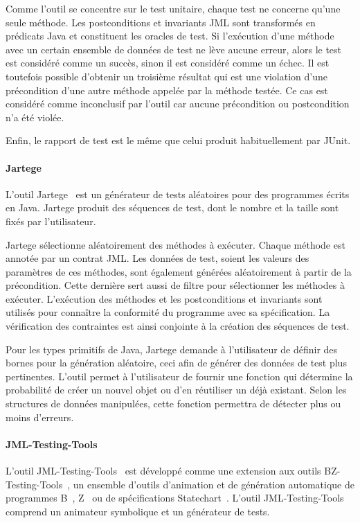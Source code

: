 Comme l'outil se concentre sur le test unitaire, chaque test ne concerne qu'une
seule méthode. Les postconditions et invariants JML sont transformés en
prédicats Java et constituent les oracles de test. Si l'exécution d'une méthode
avec un certain ensemble de données de test ne lève aucune erreur, alors le
test est considéré comme un succès, sinon il est considéré comme un échec. Il
est toutefois possible d'obtenir un troisième résultat qui est une violation
d'une précondition d'une autre méthode appelée par la méthode testée.  Ce cas
est considéré comme inconclusif par l'outil car aucune précondition ou
postcondition n'a été violée.

Enfin, le rapport de test est le même que celui produit habituellement par
JUnit.

\paragraph{Jartege} L'outil Jartege~ est un générateur de tests
aléatoires pour des programmes écrits en Java. Jartege produit des séquences de
test, dont le nombre et la taille sont fixés par l'utilisateur.

Jartege sélectionne aléatoirement des méthodes à exécuter. Chaque méthode est
annotée par un contrat JML. Les données de test, soient les valeurs des
paramètres de ces méthodes, sont également générées aléatoirement à partir de la
précondition. Cette dernière sert aussi de filtre pour sélectionner les méthodes
à exécuter. L'exécution des méthodes et les postconditions et invariants sont
utilisés pour connaître la conformité du programme avec sa spécification. La
vérification des contraintes est ainsi conjointe à la création des séquences de
test.

Pour les types primitifs de Java, Jartege demande à l'utilisateur de définir des
bornes pour la génération aléatoire, ceci afin de générer des données de test
plus pertinentes. L'outil permet à l'utilisateur de fournir une fonction qui
détermine la probabilité de créer un nouvel objet ou d'en réutiliser un déjà
existant. Selon les structures de données manipulées, cette fonction permettra
de détecter plus ou moins d'erreurs.

\paragraph{JML-Testing-Tools} L'outil JML-Testing-Tools~ est développé comme une extension aux outils
BZ-Testing-Tools~, un ensemble d'outils d'animation et de
génération automatique de programmes B~, Z~ ou
de spécifications Statechart~. L'outil JML-Testing-Tools comprend
un animateur symbolique et un générateur de tests.

